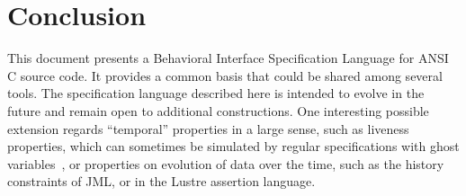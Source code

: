 
\chapter{Conclusion}

This document presents a Behavioral Interface Specification Language
for ANSI C source code. It provides a common basis that could be
shared among several tools.
The specification language described here is intended to evolve in the
future and remain open to additional constructions.
One interesting possible extension regards ``temporal''
properties in a large sense, such as liveness properties, which can
sometimes be simulated by regular specifications with ghost
variables~\cite{giorgetti06fase}, or properties on evolution of data
over the time, such as the history constraints of JML, or in the Lustre
assertion language.

